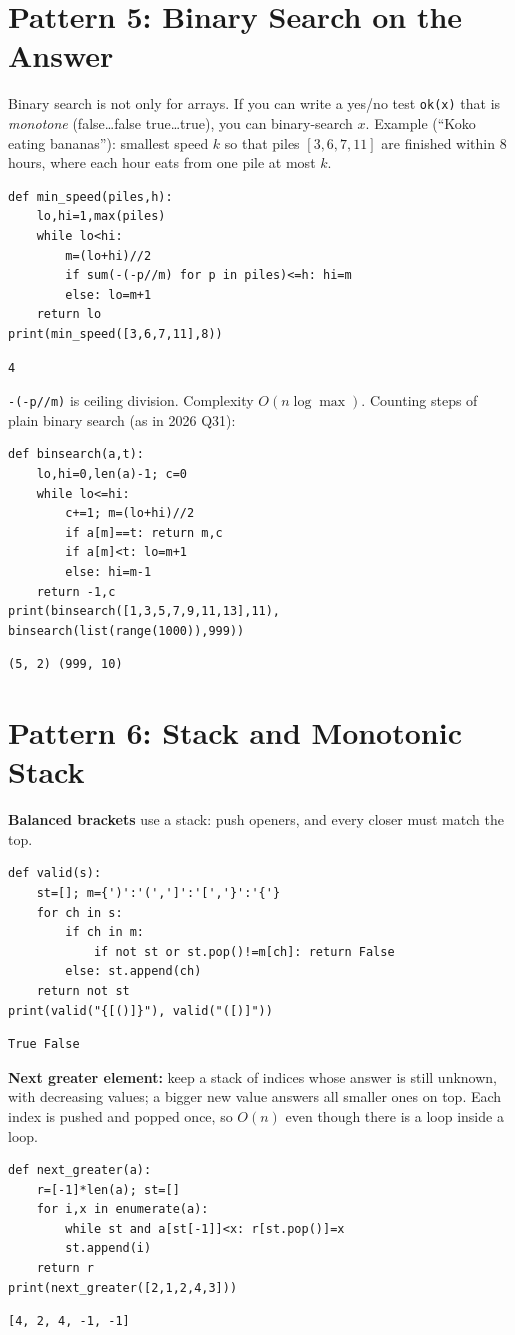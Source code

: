 \documentclass[11pt,a4paper]{article}
\newcommand{\py}[1]{\texttt{#1}}
\begin{document}
\section{Pattern 5: Binary Search on the Answer}
Binary search is not only for arrays. If you can write a yes/no test \py{ok(x)} that is \emph{monotone} (false\dots false true\dots true), you can binary-search $x$. Example (``Koko eating bananas''): smallest speed $k$ so that piles $[3,6,7,11]$ are finished within $8$ hours, where each hour eats from one pile at most $k$.
\begin{lstlisting}
def min_speed(piles,h):
    lo,hi=1,max(piles)
    while lo<hi:
        m=(lo+hi)//2
        if sum(-(-p//m) for p in piles)<=h: hi=m
        else: lo=m+1
    return lo
print(min_speed([3,6,7,11],8))
\end{lstlisting}
\begin{lstlisting}[style=out]
4
\end{lstlisting}
\py{-(-p//m)} is ceiling division. Complexity $O(n\log\max)$. Counting steps of plain binary search (as in 2026 Q31):
\begin{lstlisting}
def binsearch(a,t):
    lo,hi=0,len(a)-1; c=0
    while lo<=hi:
        c+=1; m=(lo+hi)//2
        if a[m]==t: return m,c
        if a[m]<t: lo=m+1
        else: hi=m-1
    return -1,c
print(binsearch([1,3,5,7,9,11,13],11), binsearch(list(range(1000)),999))
\end{lstlisting}
\begin{lstlisting}[style=out]
(5, 2) (999, 10)
\end{lstlisting}

\section{Pattern 6: Stack and Monotonic Stack}
\textbf{Balanced brackets} use a stack: push openers, and every closer must match the top.
\begin{lstlisting}
def valid(s):
    st=[]; m={')':'(',']':'[','}':'{'}
    for ch in s:
        if ch in m:
            if not st or st.pop()!=m[ch]: return False
        else: st.append(ch)
    return not st
print(valid("{[()]}"), valid("([)]"))
\end{lstlisting}
\begin{lstlisting}[style=out]
True False
\end{lstlisting}
\textbf{Next greater element:} keep a stack of indices whose answer is still unknown, with decreasing values; a bigger new value answers all smaller ones on top. Each index is pushed and popped once, so $O(n)$ even though there is a loop inside a loop.
\begin{lstlisting}
def next_greater(a):
    r=[-1]*len(a); st=[]
    for i,x in enumerate(a):
        while st and a[st[-1]]<x: r[st.pop()]=x
        st.append(i)
    return r
print(next_greater([2,1,2,4,3]))
\end{lstlisting}
\begin{lstlisting}[style=out]
[4, 2, 4, -1, -1]
\end{lstlisting}
\end{document}
